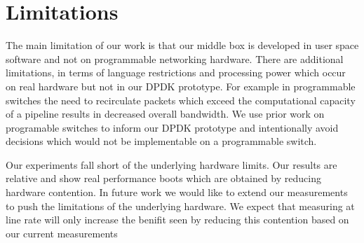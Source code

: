 \section{Limitations}

The main limitation of our work is that our middle box is developed in user
space software and not on programmable networking hardware. There are additional
limitations, in terms of language restrictions and processing power which occur
on real hardware but not in our DPDK prototype. For example in programmable
switches the need to recirculate packets which exceed the computational capacity
of a pipeline results in decreased overall bandwidth. We use prior work on
programable switches to inform our DPDK prototype and intentionally avoid
decisions which would not be implementable on a programmable switch.

Our experiments fall short of the underlying hardware limits. Our results are
relative and show real performance boots which are obtained by reducing hardware
contention. In future work we would like to extend our measurements to push the
limitations of the underlying hardware. We expect that measuring at line rate
will only increase the benifit seen by reducing this contention based on our
current measurements~
